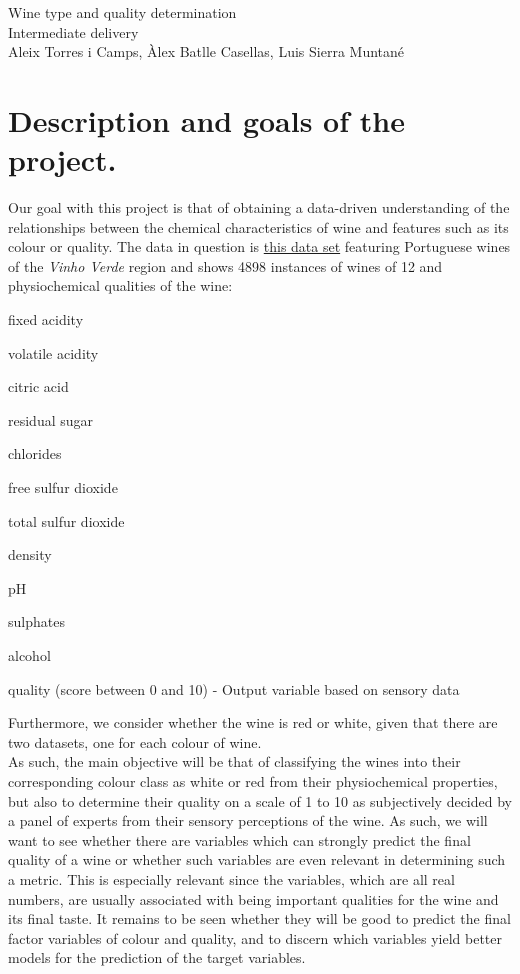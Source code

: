 \documentclass[10pt]{article}
\begin{document}
\begingroup
  \centering
  \Huge Wine type and quality determination \\
  \vskip 0.35cm
  \LARGE Intermediate delivery\\
  \vskip 0.25cm
  \large Aleix Torres i Camps, Àlex Batlle Casellas, Luis Sierra Muntané\\[1.5em]
\endgroup


\section{Description and goals of the project.}
Our goal with this project is that of obtaining a data-driven understanding of the relationships between the chemical characteristics of wine and features such as its colour or quality. The data in question is \href{http://archive.ics.uci.edu/ml/datasets/Wine+Quality}{this data set} featuring Portuguese wines of the \textit{Vinho Verde} region and shows 4898 instances of wines of 12 and physiochemical qualities of the wine: 

\begin{ennumerate}
\item fixed acidity
\item volatile acidity
\item citric acid
\item residual sugar
\item chlorides
\item free sulfur dioxide
\item total sulfur dioxide
\item density
\item pH
\item sulphates
\item alcohol
\item quality (score between 0 and 10) - Output variable based on sensory data
\end{ennumerate}

Furthermore, we consider whether the wine is red or white, given that there are two datasets, one for each colour of wine.
\\ As such, the main objective will be that of classifying the wines into their corresponding colour class as white or red from their physiochemical properties, but also to determine their quality on a scale of 1 to 10 as subjectively decided by a panel of experts from their sensory perceptions of the wine. As such, we will want to see whether there are variables which can strongly predict the final quality of a wine or whether such variables are even relevant in determining such a metric. This is especially relevant since the variables, which are all real numbers, are usually associated with being important qualities for the wine and its final taste. It remains to be seen whether they will be good to predict the final factor variables of colour and quality, and to discern which variables yield better models for the prediction of the target variables.
\end{document}
